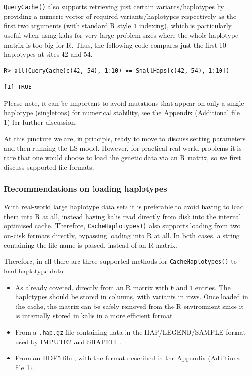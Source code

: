 \documentclass[a4paper]{article}
\let\proglang=\textsf
\newcommand{\pkg}[1]{{\fontseries{m}\fontseries{b}\selectfont #1}}
\begin{document}
\texttt{QueryCache()} also supports retrieving just certain variants/haplotypes by providing a numeric vector of required variants/haplotypes respectively as the first two arguments (with standard \proglang{R} style \texttt{1} indexing), which is particularly useful when using \pkg{kalis} for very large problem sizes where the whole haplotype matrix is too big for \proglang{R}.
Thus, the following code compares just the first 10 haplotypes at sites 42 and 54.

\begin{verbatim}
R> all(QueryCache(c(42, 54), 1:10) == SmallHaps[c(42, 54), 1:10])
\end{verbatim}
\begin{verbatim}
[1] TRUE
\end{verbatim}

Please note, it can be important to avoid mutations that appear on only a single haplotype (singletons) for numerical stability, see the Appendix (Additional file 1) for further discussion.

At this juncture we are, in principle, ready to move to discuss setting parameters and then running the LS model.
However, for practical real-world problems it is rare that one would choose to load the genetic data via an \proglang{R} matrix, so we first discuss supported file formats.



\subsubsection*{Recommendations on loading haplotypes}
\label{recommendations-on-loading-haplotypes}

With real-world large haplotype data sets it is preferable to avoid having to load them into \proglang{R} at all, instead having \pkg{kalis} read directly from disk into the internal optimised cache.
Therefore, \texttt{CacheHaplotypes()} also supports loading from two on-disk formats directly, bypassing loading into \proglang{R} at all.
In both cases, a string containing the file name is passed, instead of an \proglang{R} matrix.

Therefore, in all there are three supported methods for \texttt{CacheHaplotypes()} to load haplotype data:

\begin{itemize}
	\item
	As already covered, directly from an \proglang{R} matrix with \texttt{0} and \texttt{1} entries.
	The haplotypes should be stored in columns, with variants in rows.
	Once loaded in the cache, the matrix can be safely removed from the \proglang{R} environment since it is internally stored in \pkg{kalis} in a more efficient format.
	\item
	From a \texttt{.hap.gz} file containing data in the HAP/LEGEND/SAMPLE format used by IMPUTE2 \cite{impute2} and SHAPEIT \cite{shapeit}.
	\item
	From an HDF5 file \cite{hdf5}, with the format described in the Appendix (Additional file 1).
\end{itemize}
\end{document}
